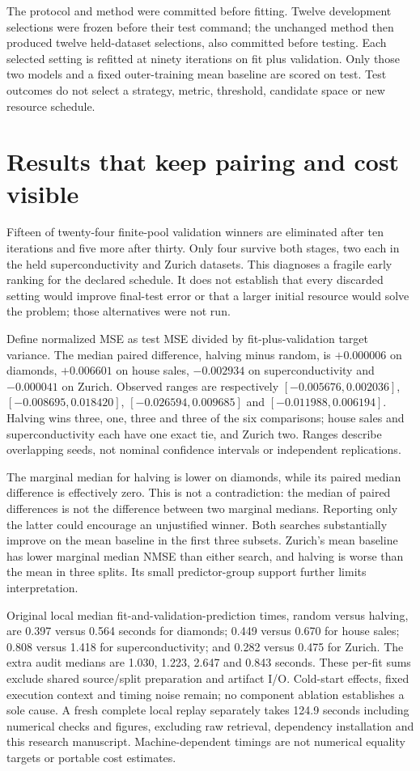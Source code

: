 \documentclass[11pt]{article}
\begin{document}
The protocol and method were committed before fitting. Twelve development selections were frozen before their test command; the unchanged method then produced twelve held-dataset selections, also committed before testing. Each selected setting is refitted at ninety iterations on fit plus validation. Only those two models and a fixed outer-training mean baseline are scored on test. Test outcomes do not select a strategy, metric, threshold, candidate space or new resource schedule.
\section{Results that keep pairing and cost visible}
Fifteen of twenty-four finite-pool validation winners are eliminated after ten iterations and five more after thirty. Only four survive both stages, two each in the held superconductivity and Zurich datasets. This diagnoses a fragile early ranking for the declared schedule. It does not establish that every discarded setting would improve final-test error or that a larger initial resource would solve the problem; those alternatives were not run.

Define normalized MSE as test MSE divided by fit-plus-validation target variance. The median paired difference, halving minus random, is $+0.000006$ on diamonds, $+0.006601$ on house sales, $-0.002934$ on superconductivity and $-0.000041$ on Zurich. Observed ranges are respectively $[-0.005676,0.002036]$, $[-0.008695,0.018420]$, $[-0.026594,0.009685]$ and $[-0.011988,0.006194]$. Halving wins three, one, three and three of the six comparisons; house sales and superconductivity each have one exact tie, and Zurich two. Ranges describe overlapping seeds, not nominal confidence intervals or independent replications.

The marginal median for halving is lower on diamonds, while its paired median difference is effectively zero. This is not a contradiction: the median of paired differences is not the difference between two marginal medians. Reporting only the latter could encourage an unjustified winner. Both searches substantially improve on the mean baseline in the first three subsets. Zurich's mean baseline has lower marginal median NMSE than either search, and halving is worse than the mean in three splits. Its small predictor-group support further limits interpretation.

Original local median fit-and-validation-prediction times, random versus halving, are 0.397 versus 0.564 seconds for diamonds; 0.449 versus 0.670 for house sales; 0.808 versus 1.418 for superconductivity; and 0.282 versus 0.475 for Zurich. The extra audit medians are 1.030, 1.223, 2.647 and 0.843 seconds. These per-fit sums exclude shared source/split preparation and artifact I/O. Cold-start effects, fixed execution context and timing noise remain; no component ablation establishes a sole cause. A fresh complete local replay separately takes 124.9 seconds including numerical checks and figures, excluding raw retrieval, dependency installation and this research manuscript. Machine-dependent timings are not numerical equality targets or portable cost estimates.
\end{document}
